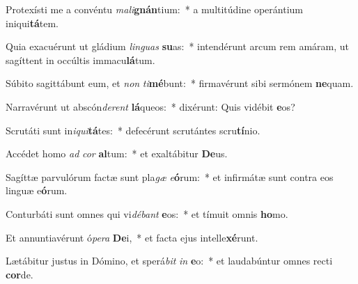 \item Protexísti me a convéntu \textit{ma}\textit{li}\textbf{gnán}tium:~* a multitúdine operántium iniqui\textbf{tá}tem.
\item Quia exacuérunt ut gládium \textit{lin}\textit{guas} \textbf{su}as:~* intendérunt arcum rem amáram, ut sagíttent in occúltis immacu\textbf{lá}tum.
\item Súbito sagittábunt eum, et \textit{non} \textit{ti}\textbf{mé}bunt:~* firmavérunt sibi sermónem \textbf{ne}quam.
\item Narravérunt ut abscón\textit{de}\textit{rent} \textbf{lá}queos:~* dixérunt: Quis vidébit \textbf{e}os?
\item Scrutáti sunt in\textit{i}\textit{qui}\textbf{tá}tes:~* defecérunt scrutántes scru\textbf{tí}nio.
\item Accédet homo \textit{ad} \textit{cor} \textbf{al}tum:~* et exaltábitur \textbf{De}us.
\item Sagíttæ parvulórum factæ sunt pla\textit{gæ} \textit{e}\textbf{ó}rum:~* et infirmátæ sunt contra eos linguæ e\textbf{ó}rum.
\item Conturbáti sunt omnes qui vi\textit{dé}\textit{bant} \textbf{e}os:~* et tímuit omnis \textbf{ho}mo.
\item Et annuntiavérunt ó\textit{pe}\textit{ra} \textbf{De}i,~* et facta ejus intelle\textbf{xé}runt.
\item Lætábitur justus in Dómino, et sperá\textit{bit} \textit{in} \textbf{e}o:~* et laudabúntur omnes recti \textbf{cor}de.
